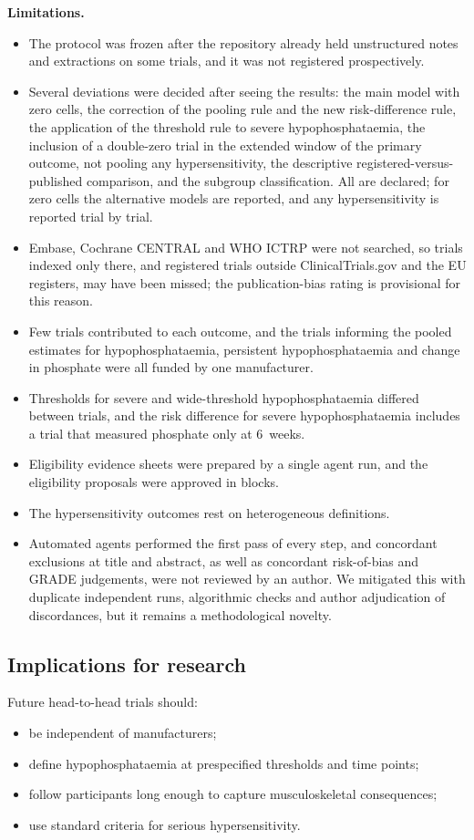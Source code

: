 \documentclass[11pt,a4paper]{article}
\begin{document}
\textbf{Limitations.}
\begin{itemize}
\item The protocol was frozen after the repository already held unstructured notes and extractions on some trials, and it was not registered prospectively.
\item Several deviations were decided after seeing the results: the main model with zero cells, the correction of the pooling rule and the new risk-difference rule, the application of the threshold rule to severe hypophosphataemia, the inclusion of a double-zero trial in the extended window of the primary outcome, not pooling any hypersensitivity, the descriptive registered-versus-published comparison, and the subgroup classification. All are declared; for zero cells the alternative models are reported, and any hypersensitivity is reported trial by trial.
\item Embase, Cochrane CENTRAL and WHO ICTRP were not searched, so trials indexed only there, and registered trials outside ClinicalTrials.gov and the EU registers, may have been missed; the publication-bias rating is provisional for this reason.
\item Few trials contributed to each outcome, and the trials informing the pooled estimates for hypophosphataemia, persistent hypophosphataemia and change in phosphate were all funded by one manufacturer.
\item Thresholds for severe and wide-threshold hypophosphataemia differed between trials, and the risk difference for severe hypophosphataemia includes a trial that measured phosphate only at 6~weeks.
\item Eligibility evidence sheets were prepared by a single agent run, and the eligibility proposals were approved in blocks.
\item The hypersensitivity outcomes rest on heterogeneous definitions.
\item Automated agents performed the first pass of every step, and concordant exclusions at title and abstract, as well as concordant risk-of-bias and GRADE judgements, were not reviewed by an author. We mitigated this with duplicate independent runs, algorithmic checks and author adjudication of discordances, but it remains a methodological novelty.
\end{itemize}

\subsection{Implications for research}
Future head-to-head trials should:
\begin{itemize}
\item be independent of manufacturers;
\item define hypophosphataemia at prespecified thresholds and time points;
\item follow participants long enough to capture musculoskeletal consequences;
\item use standard criteria for serious hypersensitivity.
\end{itemize}
\end{document}
